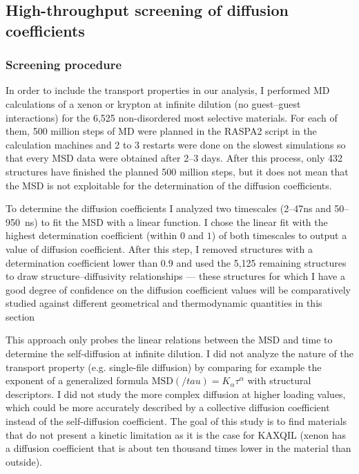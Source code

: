 \documentclass[main]{subfiles}
\begin{document}
\subsection{High-throughput screening of diffusion coefficients}

\subsubsection{Screening procedure}

In order to include the transport properties in our analysis, I performed MD calculations of a xenon or krypton at infinite dilution (no guest--guest interactions) for the 6,525 non-disordered most selective materials. For each of them, 500 million steps of MD were planned in the RASPA2 script in the calculation machines and 2 to 3 restarts were done on the slowest simulations so that every MSD data were obtained after 2--3 days. After this process, only 432 structures have finished the planned 500 million steps, but it does not mean that the MSD is not exploitable for the determination of the diffusion coefficients. 

To determine the diffusion coefficients I analyzed two timescales (2--47\si{\ns} and 50--950~\si{\ns}) to fit the MSD with a linear function. I chose the linear fit with the highest determination coefficient (within $0$ and $1$) of both timescales to output a value of diffusion coefficient. After this step, I removed structures with a determination coefficient lower than $0.9$ and used the 5,125 remaining structures to draw structure--diffusivity relationships --- these structures for which I have a good degree of confidence on the diffusion coefficient values will be comparatively studied against different geometrical and thermodynamic quantities in this section

This approach only probes the linear relations between the MSD and time to determine the self-diffusion at infinite dilution. I did not analyze the nature of the transport property (e.g. single-file diffusion\autocite{Lin_2005}) by comparing for example the exponent of a generalized formula $\text{MSD}(/tau) = K_\alpha\tau^\alpha$ with structural descriptors. I did not study the more complex diffusion at higher loading values, which could be more accurately described by a collective diffusion coefficient instead of the self-diffusion coefficient. The goal of this study is to find materials that do not present a kinetic limitation as it is the case for KAXQIL\autocite{Banerjee2012} (xenon has a diffusion coefficient that is about ten thousand times lower in the material than outside).
\end{document}
